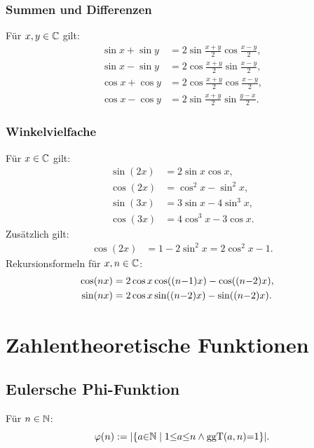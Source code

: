 \subsubsection{Summen und Differenzen}
Für $x,y\in\mathbb C$ gilt:
\begin{align}
\sin x+\sin y &= 2\sin\frac{x+y}{2}\cos\frac{x-y}{2},\\
\sin x-\sin y &= 2\cos\frac{x+y}{2}\sin\frac{x-y}{2},\\
\cos x+\cos y &= 2\cos\frac{x+y}{2}\cos\frac{x-y}{2},\\
\cos x-\cos y &= 2\sin\frac{x+y}{2}\sin\frac{y-x}{2}.
\end{align}

\subsubsection{Winkelvielfache}
Für $x\in\mathbb C$ gilt:
\begin{align}
\sin(2x) &= 2\sin x\cos x,\\
\cos(2x) &= \cos^2 x-\sin^2 x,\\
\sin(3x) &= 3\sin x-4\sin^3 x,\\
\cos(3x) &= 4\cos^3 x-3\cos x.
\end{align}
Zusätzlich gilt:
\begin{align}
\cos(2x) &= 1-2\sin^2 x = 2\cos^2 x-1.
\end{align}
Rekursionsformeln für $x,n\in\mathbb C$:
\begin{align}
\hspace{-1em}\cos(nx) &= 2\cos x \cos((n{-}1)x) - \cos((n{-}2)x),\\
\hspace{-1em}\sin(nx) &= 2\cos x \sin((n{-}2)x) - \sin((n{-}2)x).
\end{align}

\section{Zahlentheoretische Funktionen}
\subsection{Eulersche Phi-Funktion}

\begin{definition}\mbox{}\newline
Für $n\in\mathbb N$:
\begin{equation}
\varphi(n) := |\{a{\in}\mathbb N\mid 1{\le}a{\le}n\wedge\operatorname{ggT}(a,n){=}1\}|.
\end{equation}
\end{definition}

